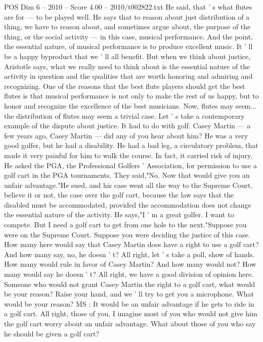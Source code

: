 \begin{textsample}{POS Dim 6 – 2010 – Score 4.00 – 2010/t002822.txt}
He said, that ' s what flutes are for — to be played well.
He says that to reason about just distribution of a thing, we have to reason about, and sometimes argue about, the purpose of the thing, or the social activity — in this case, musical performance.
And the point, the essential nature, of musical performance is to produce excellent music.
It ' ll be a happy byproduct that we ' ll all benefit.
But when we think about justice, Aristotle says, what we really need to think about is the essential nature of the activity in question and the qualities that are worth honoring and admiring and recognizing.
One of the reasons that the best flute players should get the best flutes is that musical performance is not only to make the rest of us happy, but to honor and recognize the excellence of the best musicians.
Now, flutes may seem... the distribution of flutes may seem a trivial case.
Let ' s take a contemporary example of the dispute about justice.
It had to do with golf.
Casey Martin — a few years ago, Casey Martin — did any of you hear about him?
He was a very good golfer, but he had a disability.
He had a bad leg, a circulatory problem, that made it very painful for him to walk the course.
In fact, it carried risk of injury.
He asked the PGA, the Professional Golfers ' Association, for permission to use a golf cart in the PGA tournaments.
They said,"No.
Now that would give you an unfair advantage."He sued, and his case went all the way to the Supreme Court, believe it or not, the case over the golf cart, because the law says that the disabled must be accommodated, provided the accommodation does not change the essential nature of the activity.
He says,"I ' m a great golfer.
I want to compete.
But I need a golf cart to get from one hole to the next."Suppose you were on the Supreme Court.
Suppose you were deciding the justice of this case.
How many here would say that Casey Martin does have a right to use a golf cart?
And how many say, no, he doesn ' t?
All right, let ' s take a poll, show of hands.
How many would rule in favor of Casey Martin?
And how many would not?
How many would say he doesn ' t?
All right, we have a good division of opinion here.
Someone who would not grant Casey Martin the right to a golf cart, what would be your reason?
Raise your hand, and we ' ll try to get you a microphone.
What would be your reason?
MS : It would be an unfair advantage if he gets to ride in a golf cart.
All right, those of you, I imagine most of you who would not give him the golf cart worry about an unfair advantage.
What about those of you who say he should be given a golf cart?

\end{textsample}

